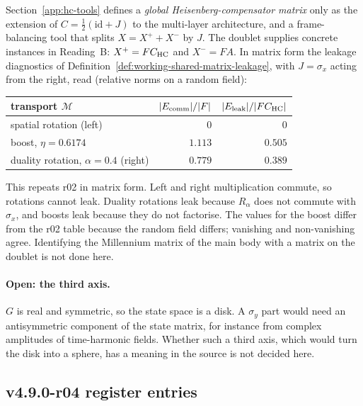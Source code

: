 Section~\ref{app:hc-tools} defines a \emph{global Heisenberg-compensator matrix} only as the extension of
\(C=\tfrac12(\mathrm{id}+J)\) to the multi-layer architecture, and a frame-balancing tool that splits \(X=X^++X^-\) by
\(J\).  The doublet supplies concrete instances in Reading~B: \(X^+=FC_{\mathrm{HC}}\) and \(X^-=FA\).  In matrix form the leakage
diagnostics of Definition~\ref{def:working-shared-matrix-leakage}, with \(J=\sigma_x\) acting from the right, read
(relative norms on a random field):
\begin{center}
\small
\begin{tabular}{@{}lrr@{}}
\toprule
transport \(\mathcal M\) & \(|E_{\rm comm}|/|F|\) & \(|E_{\rm leak}|/|FC_{\mathrm{HC}}|\)\\
\midrule
spatial rotation (left) & \(0\) & \(0\)\\
boost, \(\eta=0.6174\) & \(1.113\) & \(0.505\)\\
duality rotation, \(\alpha=0.4\) (right) & \(0.779\) & \(0.389\)\\
\bottomrule
\end{tabular}
\end{center}
This repeats r02 in matrix form.  Left and right multiplication commute, so rotations cannot leak.  Duality rotations
leak because \(R_\alpha\) does not commute with \(\sigma_x\), and boosts leak because they do not factorise.  The values
for the boost differ from the r02 table because the random field differs; vanishing and non-vanishing agree.  Identifying
the Millennium matrix of the main body with a matrix on the doublet is not done here.

\paragraph{Open: the third axis.}
\(G\) is real and symmetric, so the state space is a disk.  A \(\sigma_y\) part would need an antisymmetric component of
the state matrix, for instance from complex amplitudes of time-harmonic fields.  Whether such a third axis, which would
turn the disk into a sphere, has a meaning in the source is not decided here.

\subsection*{v4.9.0-r04 register entries}
\label{subsec:v490-r04-register}

